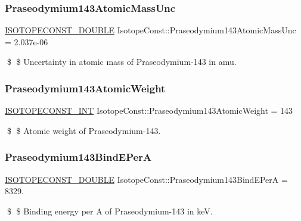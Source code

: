 \subsubsection{\texorpdfstring{Praseodymium143\+Atomic\+Mass\+Unc}{Praseodymium143AtomicMassUnc}}
{\footnotesize\ttfamily \mbox{\hyperlink{group___isotope_const-_macros_ga8f45a7272ce02c0b4c65c44636ed719a}{I\+S\+O\+T\+O\+P\+E\+C\+O\+N\+S\+T\+\_\+\+D\+O\+U\+B\+LE}} Isotope\+Const\+::\+Praseodymium143\+Atomic\+Mass\+Unc = 2.\+037e-\/06}

\$ \$ Uncertainty in atomic mass of Praseodymium-\/143 in amu. \mbox{\label{group___isotope_const-_praseodymium-_pr143_gac25b4726ce1f06625e4b42d4e3b36a26}} 
\subsubsection{\texorpdfstring{Praseodymium143\+Atomic\+Weight}{Praseodymium143AtomicWeight}}
{\footnotesize\ttfamily \mbox{\hyperlink{group___isotope_const-_macros_ga5f18360b3e99483a35c32d789e62621c}{I\+S\+O\+T\+O\+P\+E\+C\+O\+N\+S\+T\+\_\+\+I\+NT}} Isotope\+Const\+::\+Praseodymium143\+Atomic\+Weight = 143}

\$ \$ Atomic weight of Praseodymium-\/143. \mbox{\label{group___isotope_const-_praseodymium-_pr143_gac5e97313907858f5235b33ae578b54e1}} 
\subsubsection{\texorpdfstring{Praseodymium143\+Bind\+E\+PerA}{Praseodymium143BindEPerA}}
{\footnotesize\ttfamily \mbox{\hyperlink{group___isotope_const-_macros_ga8f45a7272ce02c0b4c65c44636ed719a}{I\+S\+O\+T\+O\+P\+E\+C\+O\+N\+S\+T\+\_\+\+D\+O\+U\+B\+LE}} Isotope\+Const\+::\+Praseodymium143\+Bind\+E\+PerA = 8329.}

\$ \$ Binding energy per A of Praseodymium-\/143 in keV. \mbox{\label{group___isotope_const-_praseodymium-_pr143_ga0a3f4a63dd8d2c69bd5f6ae72b382427}} 
